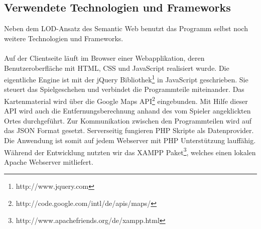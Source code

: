\documentclass[a4paper, 11pt]{article}
\begin{document}
\subsection{Verwendete Technologien und Frameworks}
Neben dem LOD-Ansatz des Semantic Web benutzt das Programm selbst noch weitere Technologien und Frameworks.\\\\
Auf der Clientseite läuft im Browser einer Webapplikation, deren Benutzeroberfläche mit HTML, CSS und JavaScript realisiert wurde. Die eigentliche Engine ist mit der jQuery Bibliothek\footnote{http://www.jquery.com} in JavaScript geschrieben. Sie steuert das Spielgeschehen und verbindet die Programmteile miteinander. Das Kartenmaterial wird über die Google Maps API\footnote{http://code.google.com/intl/de/apis/maps/} eingebunden. Mit Hilfe dieser API wird auch die Entfernungsberechnung anhand des vom Spieler angeklickten Ortes durchgeführt. Zur Kommunikation zwischen den Programmteilen wird auf das JSON Format gesetzt. Serverseitig fungieren PHP Skripte als Datenprovider. Die Anwendung ist somit auf jedem Webserver mit PHP Unterstützung lauffähig. Während der Entwicklung nutzten wir das XAMPP Paket\footnote{http://www.apachefriends.org/de/xampp.html}, welches einen lokalen Apache Webserver mitliefert.
\end{document}
